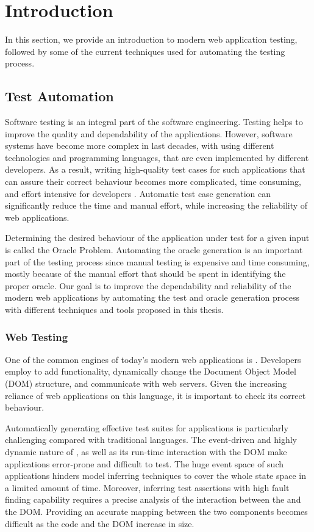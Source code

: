 \chapter{Introduction} \label{chap:intro}
In this section, we provide an introduction to modern web application testing, followed by some of the current techniques used for automating the testing process.

\section{Test Automation} \label{Sec:web-testing}
Software testing is an integral part of the software engineering.
Testing helps to improve the quality and dependability of the applications.
However, software systems have become more complex in last decades, with using different technologies and programming languages, that are even implemented by different developers.
As a result, writing high-quality test cases for such applications that can assure their correct behaviour becomes more complicated, time consuming, and effort intensive for developers \cite{anand:jss13}.
Automatic test case generation can significantly reduce the time and manual effort, while
increasing the reliability of web applications.

Determining the desired behaviour of the application under test for a given input is called the Oracle Problem.
Automating the oracle generation is an important part of the testing process since
manual testing is expensive and time consuming, mostly because of the manual effort that should be spent in identifying the proper oracle. Our goal is to improve the dependability and reliability of the modern web applications by automating the test and oracle generation process with different techniques and tools proposed in this thesis.

\subsection{Web Testing}
One of the common engines of today's modern web applications is \javascript.
Developers employ \javascript to add functionality, dynamically change the Document Object Model (DOM) structure,
and communicate with web servers. Given the increasing reliance of web applications on this language, it is important to check its correct behaviour.

Automatically generating effective test suites for \javascript applications is particularly challenging compared with traditional languages.
The event-driven and highly dynamic nature of \javascript, as well as its run-time interaction with the DOM make \javascript applications error-prone \cite{Ocariza:esem2013} and difficult to test. The huge event space of such applications hinders model inferring techniques to cover the whole state space in a limited amount of time. Moreover, inferring test assertions with high fault finding capability requires a precise analysis of the interaction between the \javascript and the DOM. 
Providing an accurate mapping between the two components becomes difficult as the \javascript code and the DOM increase in size. 

